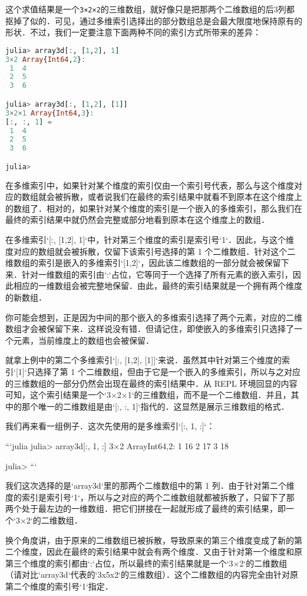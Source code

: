这个求值结果是一个\verb|3×2×2|的三维数组，就好像只是把那两个二维数组的后3列都抠掉了似的．可见，通过多维索引选择出的部分数组总是会最大限度地保持原有的形状．不过，我们一定要注意下面两种不同的索引方式所带来的差异：

\begin{lstlisting}[language=julia]
julia> array3d[:, [1,2], 1]
3×2 Array{Int64,2}:
 1  4
 2  5
 3  6

julia> array3d[:, [1,2], [1]]
3×2×1 Array{Int64,3}:
[:, :, 1] =
 1  4
 2  5
 3  6

julia> 
\end{lstlisting}

在多维索引中，如果针对某个维度的索引仅由一个索引号代表，那么与这个维度对应的数组就会被拆散，或者说我们在最终的索引结果中就看不到原本在这个维度上的数组了．相对的，如果针对某个维度的索引是一个嵌入的多维索引，那么我们在最终的索引结果中就仍然会完整或部分地看到原本在这个维度上的数组．

在多维索引`[:, [1,2], 1]`中，针对第三个维度的索引是索引号`1`．因此，与这个维度对应的数组就会被拆散，仅留下该索引号选择的第 1 个二维数组．针对这个二维数组的索引是嵌入的多维索引`[1,2]`，因此该二维数组的一部分就会被保留下来．针对一维数组的索引由`:`占位，它等同于一个选择了所有元素的嵌入索引，因此相应的一维数组会被完整地保留．由此，最终的索引结果就是一个拥有两个维度的新数组．

你可能会想到，正是因为中间的那个嵌入的多维索引选择了两个元素，对应的二维数组才会被保留下来．这样说没有错．但请记住，即使嵌入的多维索引只选择了一个元素，当前维度上的数组也会被保留．

就拿上例中的第二个多维索引`[:, [1,2], [1]]`来说．虽然其中针对第三个维度的索引`[1]`只选择了第 1 个二维数组，但由于它是一个嵌入的多维索引，所以与之对应的三维数组的一部分仍然会出现在最终的索引结果中．从 REPL 环境回显的内容可知，这个索引结果是一个`3×2×1`的三维数组，而不是一个二维数组．并且，其中的那个唯一的二维数组是由`[:, :, 1]`指代的．这显然是展示三维数组的格式．

我们再来看一组例子．这次先使用的是多维索引`[:, 1, :]`：

```julia
julia> array3d[:, 1, :]
3×2 Array{Int64,2}:
 1  16
 2  17
 3  18

julia> 
```

我们这次选择的是`array3d`里的那两个二维数组中的第 1 列．由于针对第二个维度的索引是索引号`1`，所以与之对应的两个二维数组就都被拆散了，只留下了那两个处于最左边的一维数组．把它们拼接在一起就形成了最终的索引结果，即一个`3×2`的二维数组．

换个角度讲，由于原来的二维数组已被拆散，导致原来的第三个维度变成了新的第二个维度，因此在最终的索引结果中就会有两个维度．又由于针对第一个维度和原第三个维度的索引都由`:`占位，所以最终的索引结果就是一个`3×2`的二维数组（请对比`array3d`代表的`3x5x2`的三维数组）．这个二维数组的内容完全由针对原第二个维度的索引号`1`指定．

